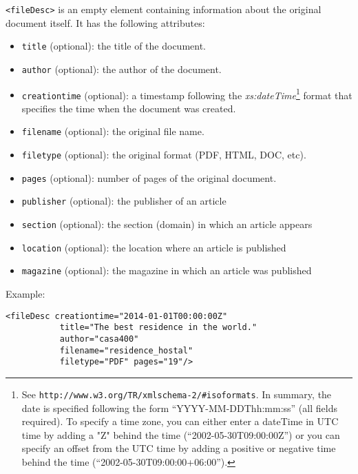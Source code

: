 \texttt{<fileDesc>} is an empty element containing information about the
original document itself. It has the following attributes:
\begin{itemize}
\item \texttt{title} (optional): the title of the document.
\item \texttt{author} (optional): the author of the document.
\item \texttt{creationtime} (optional): a timestamp following the
  \emph{xs:dateTime}\footnote{See
      \texttt{http://www.w3.org/TR/xmlschema-2/\#isoformats}. In
    summary, the date is specified following the form
    ``YYYY-MM-DDThh:mm:ss'' (all fields required). To specify a time
    zone, you can either enter a dateTime in UTC time by adding a "Z"
    behind the time (``2002-05-30T09:00:00Z'') or you can specify an
    offset from the UTC time by adding a positive or negative time
    behind the time (``2002-05-30T09:00:00+06:00'').} format that
  specifies the time when the document was created.
\item \texttt{filename} (optional): the original file name.
\item \texttt{filetype} (optional): the original format (PDF, HTML, DOC, etc).
\item \texttt{pages} (optional): number of pages of the original document.
\item \texttt{publisher} (optional): the publisher of an article
\item \texttt{section} (optional): the section (domain) in which an article appears
\item \texttt{location} (optional): the location where an article is published
\item \texttt{magazine} (optional): the magazine in which an article was published
\end{itemize}

Example:

\begin{Verbatim}[fontsize=\small]
 <fileDesc creationtime="2014-01-01T00:00:00Z"
           title="The best residence in the world."
           author="casa400"
           filename="residence_hostal"
           filetype="PDF" pages="19"/>
\end{Verbatim}


